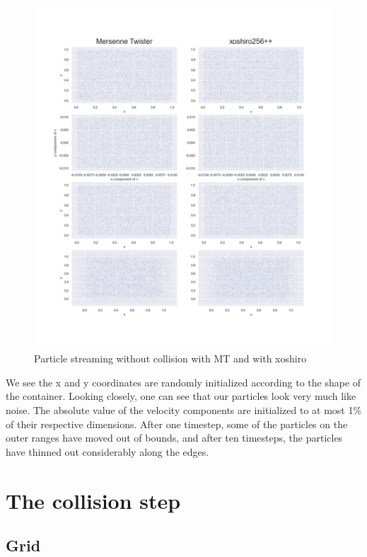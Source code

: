 \documentclass[
]{article}
\begin{document}
\begin{figure}
\centering
\includegraphics{Assets/particle_streaming.png}
\caption{Particle streaming without collision with MT and with xoshiro}
\end{figure}

We see the x and y coordinates are randomly initialized according to the
shape of the container. Looking closely, one can see that our particles
look very much like noise. The absolute value of the velocity components
are initialized to at most 1\% of their respective dimensions. After one
timestep, some of the particles on the outer ranges have moved out of
bounds, and after ten timesteps, the particles have thinned out
considerably along the edges.

\hypertarget{the-collision-step-1}{%
\section{The collision step}\label{the-collision-step-1}}

\hypertarget{grid}{%
\subsection{Grid}\label{grid}}
\end{document}
